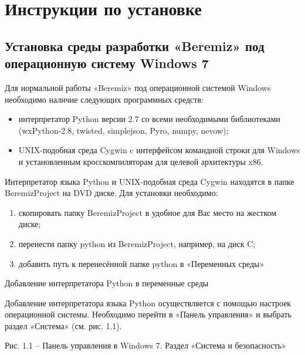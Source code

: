 \documentclass[letterpaper,10pt,russian]{sphinxmanual}
\begin{document}
\section{Инструкции по установке}
\label{install_guide/index::doc}\label{install_guide/index:id1}

\subsection{Установка среды разработки «Beremiz» под операционную систему Windows 7}
\label{install_guide/install_windows7:beremiz-windows-7}\label{install_guide/install_windows7::doc}
Для нормальной работы «Beremiz» под операционной системой Windows
необходимо наличие следующих программных средств:
\begin{itemize}
\item {} 
интерпретатор Python версии 2.7 со всеми необходимыми библиотеками
(wxPython-2.8, twisted, simplejson, Pyro, numpy, nevow);

\item {} 
UNIX-подобная среда Cygwin c интерфейсом командной строки для Windows
и установленным кросскомпиляторам для целевой архитектуры x86.

\end{itemize}

Интерпретатор языка Python и UNIX-подобная среда Cygwin находятся в
папке BeremizProject на DVD диске. Для установки необходимо:
\begin{enumerate}
\item {} 
скопировать папку BeremizProject в удобное для Вас место на жестком
диске;

\item {} 
перенести папку python из BeremizProject, например, на диск C;

\item {} 
добавить путь к перенесённой папке python в «Переменных среды»

\end{enumerate}

Добавление интерпретатора Python в переменные среды

Добавление интерпретатора языка Python осуществляется с помощью настроек
операционной системы. Необходимо перейти в «Панель управления» и выбрать
раздел «Система» (см. рис. 1.1).


Рис. 1.1 – Панель управления в Windows 7. Раздел «Система и
безопасность»
\end{document}
